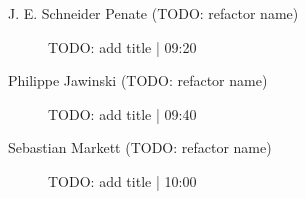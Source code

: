 \begin{symposium}
\begin{description}
                \item [J. E. Schneider Penate (TODO: refactor name)] TODO: add title \textcolor{mygray}{ | 09:20}    
                
                \item [Philippe Jawinski (TODO: refactor name)] TODO: add title \textcolor{mygray}{ | 09:40}    
                
                \item [ Sebastian Markett  (TODO: refactor name)] TODO: add title \textcolor{mygray}{ | 10:00}    
                
            \end{description} 
            \end{symposium}
            